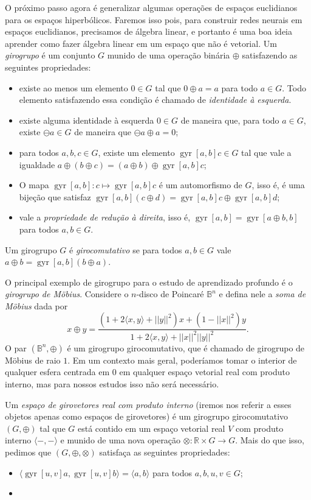 \documentclass{article}
\DeclareMathOperator{\gyr}{gyr}
\begin{document}
O próximo passo agora é generalizar algumas operações de espaços euclidianos para os espaços hiperbólicos. Faremos isso pois, para construir redes neurais em espaços euclidianos, precisamos de álgebra linear, e portanto é uma boa ideia aprender como fazer álgebra linear em um espaço que não é vetorial. Um \textit{girogrupo} é um conjunto $G$ munido de uma operação binária $\oplus$ satisfazendo as seguintes propriedades: \begin{itemize}
    \item existe ao menos um elemento $0 \in G$ tal que $0 \oplus a = a$ para todo $a \in G$. Todo elemento satisfazendo essa condição é chamado de \textit{identidade à esquerda}.
    \item existe alguma identidade à esquerda $0 \in G$ de maneira que, para todo $a \in G$, existe $\ominus a \in G$ de maneira que $\ominus a \oplus a = 0$;
    \item para todos $a, b, c \in G$, existe um elemento $\gyr[a,b]c \in G$ tal que vale a igualdade $a \oplus (b \oplus c) = (a \oplus b) \oplus \gyr[a,b]c$;
    \item O mapa $\gyr[a,b] \colon c \mapsto \gyr[a,b]c$ é um automorfismo de $G$, isso é, é uma bijeção que satisfaz $\gyr[a,b](c \oplus d) = \gyr[a,b]c \oplus \gyr[a,b]d$;
    \item vale a \textit{propriedade de redução à direita}, isso é, $\gyr[a,b] = \gyr[a \oplus b, b]$ para todos $a, b \in G$.
\end{itemize} Um girogrupo $G$ é \textit{girocomutativo} se para todos $a, b \in G$ vale $a \oplus b = \gyr[a,b](b \oplus a)$.

O principal exemplo de girogrupo para o estudo de aprendizado profundo é o \textit{girogrupo de Möbius}. Considere o $n$-disco de Poincaré $\mathbb{B}^n$ e defina nele a \textit{soma de Möbius} dada por \begin{equation}
    x \oplus y = \frac{(1 + 2\langle x, y \rangle + ||y||^2)x + (1 - ||x||^2)y}{1 + 2\langle x, y \rangle + ||x||^2 ||y||^2}.
\end{equation} O par $(\mathbb{B}^n, \oplus)$ é um girogrupo girocomutativo, que é chamado de girogrupo de Möbius de raio $1$. Em um contexto mais geral, poderíamos tomar o interior de qualquer esfera centrada em $0$ em qualquer espaço vetorial real com produto interno, mas para nossos estudos isso não será necessário.

Um \textit{espaço de girovetores real com produto interno} (iremos nos referir a esses objetos apenas como espaços de girovetores) é um girogrupo girocomutativo $(G, \oplus)$ tal que $G$ está contido em um espaço vetorial real $V$ com produto interno $\langle -, - \rangle$ e munido de uma nova operação $\otimes \colon \mathbb{R} \times G \to G$. Mais do que isso, pedimos que $(G, \oplus, \otimes)$ satisfaça as seguintes propriedades:
\begin{itemize}
    \item $\langle \gyr[u,v]a, \gyr[u,v]b \rangle = \langle a, b \rangle$ para todos $a, b, u, v \in G$;
    \item 
\end{itemize} 
\end{document}
